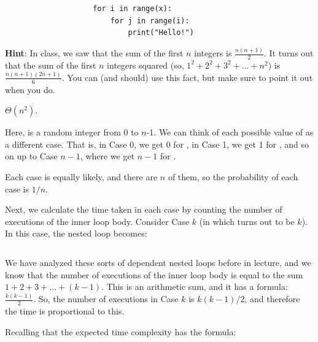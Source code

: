 \begin{prob}
\begin{subprobset}
\begin{subprob}
\begin{verbatim}
                    for i in range(x):
                        for j in range(i):
                            print("Hello!")
            \end{verbatim}

            \textbf{Hint}: In class, we saw that the sum of the first $n$
            integers is $\frac{n(n+1)}{2}$. It turns out that the sum of the
            first $n$ integers squared (so, $1^2 + 2^2 + 3^2 + \ldots + n^2$)
            is $\frac{n(n+1)(2n+1)}{6}$. You can (and should) use this fact,
            but make sure to point it out when you do.


            \begin{soln}
                $\Theta(n^{2})$.

                Here,  is a random integer from 0 to $n$-1. We can
                think of each possible value of  as a different case.
                That is, in Case 0, we get 0 for , in Case 1, we get
                1 for , and so on up to Case $n-1$, where we get
                $n-1$ for .

                Each case is equally likely, and there are $n$ of them, so the probability
                of each case is $1/n$.

                Next, we calculate the time taken in each case by counting the number
                of executions of the inner loop body. Consider Case $k$ (in which 
                turns out to be $k$). In this case, the nested loop becomes:

                \inputminted{python}{\thisdir/include-solution/loop.py}

                We have analyzed these sorts of dependent nested loops before
                in lecture, and we know that the number of executions of the
                inner loop body is equal to the sum $1 + 2 + 3 + \ldots + (k-1)$.
                This is an arithmetic sum, and it has a formula:
                $\frac{k(k-1)}{2}$. So, the number of executions in Case $k$ is
                $k(k-1)/2$, and therefore the time is proportional to this.

                Recalling that the expected time complexity has the formula:


\end{soln}
\end{subprob}
\end{subprobset}
\end{prob}
